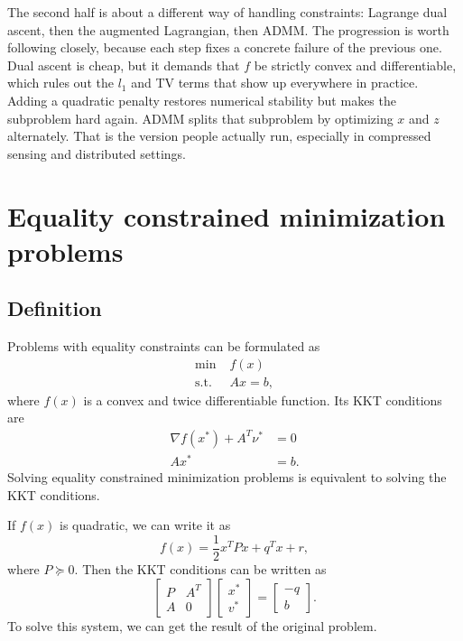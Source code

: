 \documentclass[lang=en,color=blue,mode=fancy,titlestyle=hang]{elegantbook}
\begin{document}
The second half is about a different way of handling constraints: Lagrange dual ascent, then
the augmented Lagrangian, then ADMM. The progression is worth following closely, because
each step fixes a concrete failure of the previous one. Dual ascent is cheap, but it demands
that $f$ be strictly convex and differentiable, which rules out the $l_1$ and TV terms that
show up everywhere in practice. Adding a quadratic penalty restores numerical stability but
makes the subproblem hard again. ADMM splits that subproblem by optimizing $x$ and $z$
alternately. That is the version people actually run, especially in compressed sensing and
distributed settings.


\section{Equality constrained minimization problems}
\subsection{Definition}
Problems with equality constraints can be formulated as
\begin{align*}
\min \; &f(x)\\
\text{s.t.} \; &Ax = b,
\end{align*}
where $f(x)$ is a convex and twice differentiable function. Its KKT conditions are
\begin{align*}
\nabla f(x^*) + A^T \nu^* &= 0\\
Ax^* &= b.
\end{align*}
Solving equality constrained minimization problems is equivalent to solving the KKT conditions.

If $f(x)$ is quadratic, we can write it as
\[
f(x) = \frac12 x^T P x + q^T x + r,
\]
where $P \succeq 0$. Then the KKT conditions can be written as
\[
\begin{bmatrix}
  P & A^T \\
  A & 0
\end{bmatrix}
\begin{bmatrix}
  x^* \\ v^*
\end{bmatrix} =
\begin{bmatrix}
  -q \\ b
\end{bmatrix}.
\]
To solve this system, we can get the result of the original problem.
\end{document}
